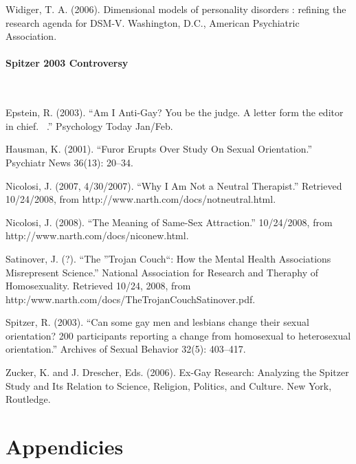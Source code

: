 \begin{refsection}
Widiger, T. A. (2006). Dimensional models of personality disorders : refining the research agenda for DSM-V. Washington, D.C., American Psychiatric Association.

\subsubsection{Spitzer 2003 Controversy}
\label{spitzer2003controversy}

~\citep{Washington:4DHpwcWC}
~\citep{Psychiatry:1-jx4ild}
~\citep{November:iRleas1e}

Epstein, R. (2003). ``Am I Anti-Gay? You be the judge. A letter form the editor in chief.  .'' Psychology Today Jan\slash Feb.

Hausman, K. (2001). ``Furor Erupts Over Study On Sexual Orientation.'' Psychiatr News 36(13): 20--34.

Nicolosi, J. (2007, 4\slash 30\slash 2007). ``Why I Am Not a Neutral Therapist.'' Retrieved 10\slash 24\slash 2008, from http:\slash \slash www.narth.com\slash docs\slash notneutral.html.

Nicolosi, J. (2008). ``The Meaning of Same-Sex Attraction.'' 10\slash 24\slash 2008, from http:\slash \slash www.narth.com\slash docs\slash niconew.html.

Satinover, J. (?). ``The ''Trojan Couch``: How the Mental Health Associations Misrepresent Science.'' National Association for Research and Theraphy of Homosexuality. Retrieved 10\slash 24, 2008, from http:\slash www.narth.com\slash docs\slash TheTrojanCouchSatinover.pdf.

Spitzer, R. (2003). ``Can some gay men and lesbians change their sexual orientation? 200 participants reporting a change from homosexual to heterosexual orientation.'' Archives of Sexual Behavior 32(5): 403--417.

Zucker, K. and J. Drescher, Eds. (2006). Ex-Gay Research: Analyzing the Spitzer Study and Its Relation to Science, Religion, Politics, and Culture. New York, Routledge.

\pagebreak 

 \renewcommand*{\thechapter}{}
\renewcommand*{\thesection}{\Alph{section}}
\setcounter{chapter}{0}
\renewcommand*{\thesubsection}{\arabic{subsection}}



\chapter{Appendicies}
\label{appendicies}


\end{refsection}
